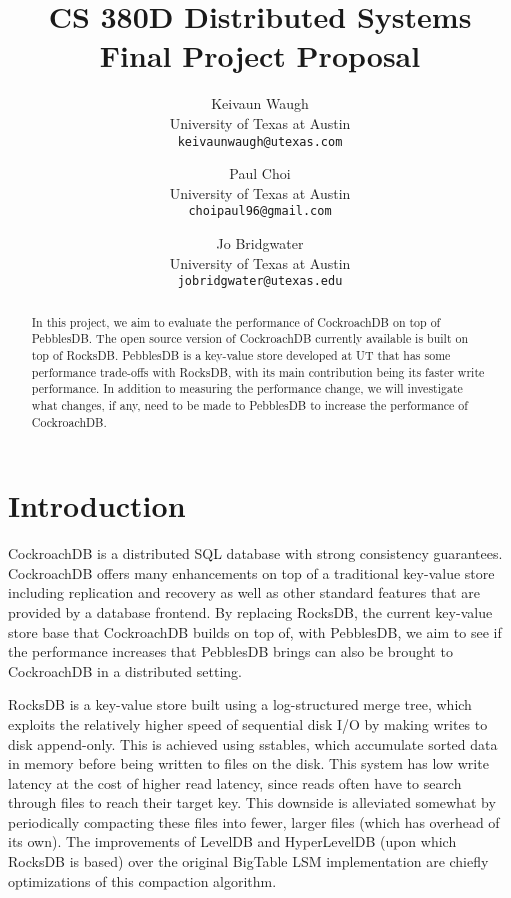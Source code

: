 \documentclass[10pt,twocolumn,letterpaper]{article}
\begin{document}
\title{CS 380D Distributed Systems Final Project Proposal}

\author{Keivaun Waugh\\
University of Texas at Austin\\
{\tt\small keivaunwaugh@utexas.com}
\and
Paul Choi\\
University of Texas at Austin\\
{\tt\small choipaul96@gmail.com}
\and
Jo Bridgwater\\
University of Texas at Austin\\
{\tt\small jobridgwater@utexas.edu}
}

\maketitle

\begin{abstract}
    In this project, we aim to evaluate the performance of CockroachDB on top of
    PebblesDB. The open source version of CockroachDB currently available is
    built on top of RocksDB. PebblesDB is a key-value store developed at UT
    that has some performance trade-offs with RocksDB, with its main
    contribution being its faster write performance. In addition to measuring
    the performance change, we will investigate what changes, if any, need to
    be made to PebblesDB to increase the performance of CockroachDB.
\end{abstract}

\section{Introduction}
CockroachDB is a distributed SQL database with strong consistency guarantees.
CockroachDB offers many enhancements on top of a traditional key-value store
including replication and recovery as well as other standard features that are
provided by a database frontend. By replacing RocksDB, the current key-value
store base that CockroachDB builds on top of, with PebblesDB, we aim to see if
the performance increases that PebblesDB brings can also be brought to
CockroachDB in a distributed setting.

RocksDB is a key-value store built using a log-structured merge tree, which
exploits the relatively higher speed of sequential disk I/O by making writes to
disk append-only. This is achieved using sstables, which accumulate sorted data
in memory before being written to files on the disk. This system has low write
latency at the cost of higher read latency, since reads often have to search
through files to reach their target key. This downside is alleviated somewhat
by periodically compacting these files into fewer, larger files (which has
overhead of its own). The improvements of LevelDB and HyperLevelDB (upon which
RocksDB is based) over the original BigTable LSM implementation are chiefly
optimizations of this compaction algorithm.
\end{document}
